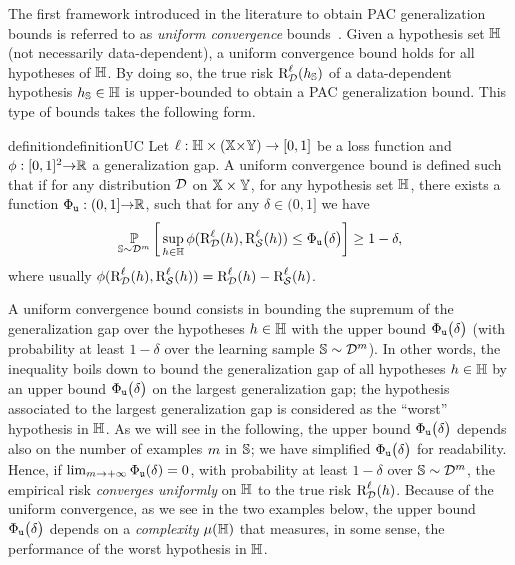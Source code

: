 The first framework introduced in the literature to obtain PAC generalization bounds is referred to as {\it uniform convergence} bounds~\citep{VapnikChervonenkis1968,VapnikChervonenkis1971}.
Given a hypothesis set $\H$ (not necessarily data-dependent), a uniform convergence bound holds for all hypotheses of $\H$.
By doing so, the true risk $\RiskLoss_{\D}(\h_{\S})$ of a data-dependent hypothesis $\h_{\S}\in\H$ is upper-bounded to obtain a PAC generalization bound.
This type of bounds takes the following form.

\begin{restatable}{definition}{definitionUC}\label{chap:intro:def:uc} Let $\loss: \H \times(\X{\times}\Y)\rightarrow [0, 1]$ be a loss function and $\phi: [0,1]^2{\to}\Rbb$ a generalization gap.
A uniform convergence bound is defined such that if for any distribution $\D$ on $\X\times\Y$, for any hypothesis set $\H$, there exists a function $\PhiUC: (0,1]{\to} \Rbb$, such that for any  $\delta\in(0, 1]$ we have
\begin{align}
\PP_{\S\sim\D^{\m}}\LB\, \sup_{\h\in\H} \phi(\RiskLoss_{\D}(\h),\RiskLoss_{\dS}(\h)) \le \PhiUC\big(\delta\big) \RB\ge 1-\delta,\label{chap:intro:eq:uc}
\end{align}
where usually $\phi(\RiskLoss_{\D}(\h),\RiskLoss_{\dS}(\h))=\RiskLoss_{\D}(\h)-\RiskLoss_{\dS}(\h)$.
\end{restatable}

A uniform convergence bound consists in bounding the supremum of the generalization gap over the hypotheses $\h\in\H$ with the upper bound $\PhiUC\big(\delta\big)$ (with probability at least $1-\delta$ over the learning sample $\S\sim\D^\m$).
In other words, the inequality boils down to bound the generalization gap of all hypotheses $\h\in\H$ by an upper bound $\PhiUC\big(\delta\big)$ on the largest generalization gap; the hypothesis associated to the largest generalization gap is considered as the ``worst'' hypothesis in $\H$.
As we will see in the following, the upper bound $\PhiUC\big(\delta\big)$ depends also on the number of examples $\m$ in $\S$; we have simplified $\PhiUC\big(\delta\big)$ for readability.
Hence, if $\lim_{\m\rightarrow+\infty}\PhiUC(\delta)= 0$, with probability at least $1-\delta$ over $\S\sim\D^\m$, the empirical risk {\it converges uniformly} on $\H$ to the true risk $\RiskLoss_{\D}(\h)$.
Because of the uniform convergence, as we see in the two examples below, the upper bound $\PhiUC\big(\delta\big)$ depends on a {\it complexity} $\comp(\H)$ that measures, in some sense, the performance of the worst hypothesis in $\H$. 

